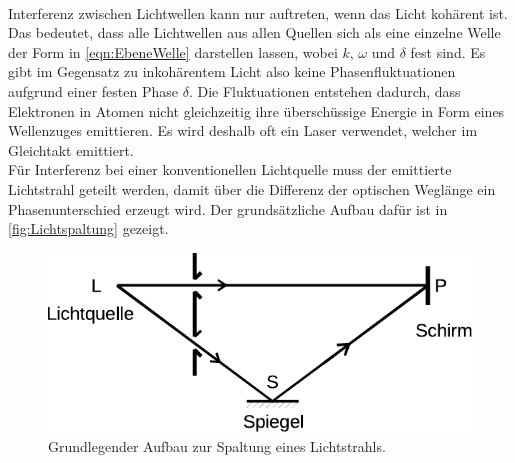     \\
    Interferenz zwischen Lichtwellen kann nur auftreten,
    wenn das Licht kohärent ist.
    Das bedeutet,
    dass alle Lichtwellen aus allen Quellen sich als eine einzelne Welle der Form in \autoref{eqn:EbeneWelle} darstellen lassen,
    wobei $k$, $\omega$ und $\delta$ fest sind.
    Es gibt im Gegensatz zu inkohärentem Licht also keine Phasenfluktuationen aufgrund einer festen Phase $\delta$.
    Die Fluktuationen entstehen dadurch,
    dass Elektronen in Atomen nicht gleichzeitig ihre überschüssige Energie in Form eines Wellenzuges emittieren.
    Es wird deshalb oft ein Laser verwendet,
    welcher im Gleichtakt emittiert.\\
    Für Interferenz bei einer konventionellen Lichtquelle muss der emittierte Lichtstrahl geteilt werden,
    damit über die Differenz der optischen Weglänge ein Phasenunterschied erzeugt wird.
    Der grundsätzliche Aufbau dafür ist in \autoref{fig:Lichtspaltung} gezeigt.

    \begin{figure}
        \centering
        \includegraphics{content/img/Abb_1.pdf}
        \caption{Grundlegender Aufbau zur Spaltung eines Lichtstrahls.}
        \label{fig:Lichtspaltung}
    \end{figure}

